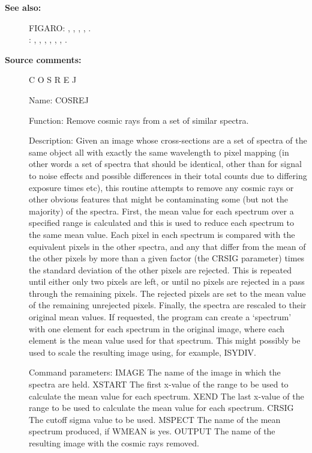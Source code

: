 \begin{description}
\begin{description}
\item [\textbf{See also:}]
FIGARO: , , , , .\\
: , , , , , , .\\

\item [\textbf{Source comments:}]
\begin{terminalv}
 C O S R E J

 Name:
    COSREJ

 Function:
    Remove cosmic rays from a set of similar spectra.

 Description:
    Given an image whose cross-sections are a set of spectra of the
    same object all with exactly the same wavelength to pixel mapping
    (in other words a set of spectra that should be identical, other
    than for signal to noise effects and possible differences in
    their total counts due to differing exposure times etc), this
    routine attempts to remove any cosmic rays or other obvious
    features that might be contaminating some (but not the majority)
    of the spectra.  First, the mean value for each spectrum over a
    specified range is calculated and this is used to reduce each
    spectrum to the same mean value.  Each pixel in each spectrum is
    compared with the equivalent pixels in the other spectra, and any
    that differ from the mean of the other pixels by more than a
    given factor (the CRSIG parameter) times the standard deviation
    of the other pixels are rejected.  This is repeated until either
    only two pixels are left, or until no pixels are rejected in a
    pass through the remaining pixels.  The rejected pixels are set
    to the mean value of the remaining unrejected pixels.  Finally,
    the spectra are rescaled to their original mean values.  If
    requested, the program can create a `spectrum' with one element
    for each spectrum in the original image, where each element is
    the mean value used for that spectrum.  This might possibly be
    used to scale the resulting image using, for example, ISYDIV.

 Command parameters:
    IMAGE    The name of the image in which the spectra are held.
    XSTART   The first x-value of the range to be used to calculate
             the mean value for each spectrum.
    XEND     The last x-value of the range to be used to calculate
             the mean value for each spectrum.
    CRSIG    The cutoff sigma value to be used.
    MSPECT   The name of the mean spectrum produced, if WMEAN is yes.
    OUTPUT   The name of the resulting image with the cosmic rays removed.


\end{terminalv}
\end{description}
\end{description}
